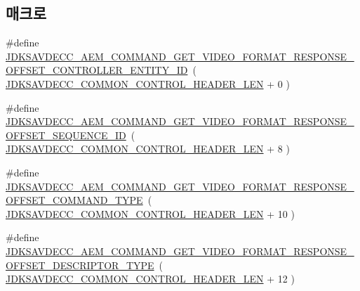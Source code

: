\subsection*{매크로}
\begin{DoxyCompactItemize}
\item 
\#define \hyperlink{group__command__get__video__format__response_ga6c726d9312eee94129dd12f10bc64143}{J\+D\+K\+S\+A\+V\+D\+E\+C\+C\+\_\+\+A\+E\+M\+\_\+\+C\+O\+M\+M\+A\+N\+D\+\_\+\+G\+E\+T\+\_\+\+V\+I\+D\+E\+O\+\_\+\+F\+O\+R\+M\+A\+T\+\_\+\+R\+E\+S\+P\+O\+N\+S\+E\+\_\+\+O\+F\+F\+S\+E\+T\+\_\+\+C\+O\+N\+T\+R\+O\+L\+L\+E\+R\+\_\+\+E\+N\+T\+I\+T\+Y\+\_\+\+ID}~( \hyperlink{group__jdksavdecc__avtp__common__control__header_gaae84052886fb1bb42f3bc5f85b741dff}{J\+D\+K\+S\+A\+V\+D\+E\+C\+C\+\_\+\+C\+O\+M\+M\+O\+N\+\_\+\+C\+O\+N\+T\+R\+O\+L\+\_\+\+H\+E\+A\+D\+E\+R\+\_\+\+L\+EN} + 0 )
\item 
\#define \hyperlink{group__command__get__video__format__response_ga6f2ab3a28c8713cbf34a5668ebab43b2}{J\+D\+K\+S\+A\+V\+D\+E\+C\+C\+\_\+\+A\+E\+M\+\_\+\+C\+O\+M\+M\+A\+N\+D\+\_\+\+G\+E\+T\+\_\+\+V\+I\+D\+E\+O\+\_\+\+F\+O\+R\+M\+A\+T\+\_\+\+R\+E\+S\+P\+O\+N\+S\+E\+\_\+\+O\+F\+F\+S\+E\+T\+\_\+\+S\+E\+Q\+U\+E\+N\+C\+E\+\_\+\+ID}~( \hyperlink{group__jdksavdecc__avtp__common__control__header_gaae84052886fb1bb42f3bc5f85b741dff}{J\+D\+K\+S\+A\+V\+D\+E\+C\+C\+\_\+\+C\+O\+M\+M\+O\+N\+\_\+\+C\+O\+N\+T\+R\+O\+L\+\_\+\+H\+E\+A\+D\+E\+R\+\_\+\+L\+EN} + 8 )
\item 
\#define \hyperlink{group__command__get__video__format__response_ga545288bd224289db706cffde87ac8d76}{J\+D\+K\+S\+A\+V\+D\+E\+C\+C\+\_\+\+A\+E\+M\+\_\+\+C\+O\+M\+M\+A\+N\+D\+\_\+\+G\+E\+T\+\_\+\+V\+I\+D\+E\+O\+\_\+\+F\+O\+R\+M\+A\+T\+\_\+\+R\+E\+S\+P\+O\+N\+S\+E\+\_\+\+O\+F\+F\+S\+E\+T\+\_\+\+C\+O\+M\+M\+A\+N\+D\+\_\+\+T\+Y\+PE}~( \hyperlink{group__jdksavdecc__avtp__common__control__header_gaae84052886fb1bb42f3bc5f85b741dff}{J\+D\+K\+S\+A\+V\+D\+E\+C\+C\+\_\+\+C\+O\+M\+M\+O\+N\+\_\+\+C\+O\+N\+T\+R\+O\+L\+\_\+\+H\+E\+A\+D\+E\+R\+\_\+\+L\+EN} + 10 )
\item 
\#define \hyperlink{group__command__get__video__format__response_ga943201dcd5dc434e462efc33c236e31b}{J\+D\+K\+S\+A\+V\+D\+E\+C\+C\+\_\+\+A\+E\+M\+\_\+\+C\+O\+M\+M\+A\+N\+D\+\_\+\+G\+E\+T\+\_\+\+V\+I\+D\+E\+O\+\_\+\+F\+O\+R\+M\+A\+T\+\_\+\+R\+E\+S\+P\+O\+N\+S\+E\+\_\+\+O\+F\+F\+S\+E\+T\+\_\+\+D\+E\+S\+C\+R\+I\+P\+T\+O\+R\+\_\+\+T\+Y\+PE}~( \hyperlink{group__jdksavdecc__avtp__common__control__header_gaae84052886fb1bb42f3bc5f85b741dff}{J\+D\+K\+S\+A\+V\+D\+E\+C\+C\+\_\+\+C\+O\+M\+M\+O\+N\+\_\+\+C\+O\+N\+T\+R\+O\+L\+\_\+\+H\+E\+A\+D\+E\+R\+\_\+\+L\+EN} + 12 )

\end{DoxyCompactItemize}
